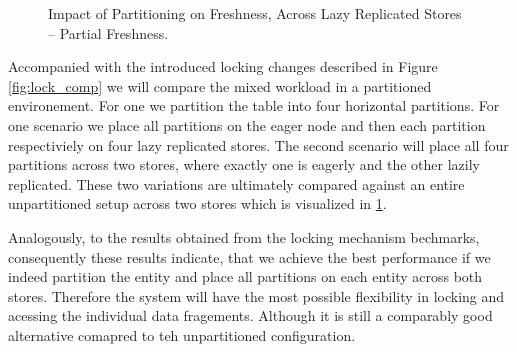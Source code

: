 \begin{figure}[t] 
    \centering 
    \caption{Impact of Partitioning on Freshness, Across Lazy Replicated Stores -- Partial Freshness.}
    \label{fig:partition_result}
\end{figure}

Accompanied with the introduced locking changes described in Figure \ref{fig:lock_comp} we will compare the mixed workload in 
a partitioned environement. For one we partition the table into four horizontal partitions. 
For one scenario we place all partitions on the eager node and then each partition respectiviely on four lazy replicated stores.
The second scenario will place all four partitions across two stores, where exactly one is eagerly and the other lazily replicated. 
These two variations are ultimately compared against an entire unpartitioned setup across two stores which is visualized in \ref{fig:partition_result}.


Analogously, to the results obtained from the locking mechanism bechmarks, consequently
these results indicate, that we achieve the best performance
if we indeed partition the entity and place all partitions on each entity across both stores. Therefore the system will have the most possible 
flexibility in locking and acessing the individual data fragements. Although 
it is still a comparably good alternative comapred to teh unpartitioned configuration.\\


